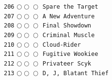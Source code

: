 \documentclass[a4paper,landscape]{article}
\begin{document}
\begin{multicols*}{5}
\texttt{206} \(\bigcirc\!\bigcirc\!\bigcirc\)  \texttt{Spare the Target} \vspace{-0.3mm}\\ 
\texttt{207} \(\bigcirc\!\bigcirc\!\bigcirc\)  \texttt{A New Adventure} \vspace{-0.3mm}\\ 
\texttt{208} \(\bigcirc\!\bigcirc\!\bigcirc\)  \texttt{Final Showdown} \vspace{-0.3mm}\\ 
\texttt{209} \(\bigcirc\!\bigcirc\!\bigcirc\)  \texttt{Criminal Muscle} \vspace{-0.3mm}\\ 
\texttt{210} \(\bigcirc\!\bigcirc\!\bigcirc\)  \texttt{Cloud-Rider} \vspace{-0.3mm}\\ 
\texttt{211} \(\bigcirc\!\bigcirc\!\bigcirc\)  \texttt{Fugitive Wookiee} \vspace{-0.3mm}\\ 
\texttt{212} \(\bigcirc\!\bigcirc\!\bigcirc\)  \texttt{Privateer Scyk} \vspace{-0.3mm}\\ 
\texttt{213} \(\bigcirc\!\bigcirc\!\bigcirc\)  \texttt{D, J, Blatant Thief} \vspace{-0.3mm}\\ 

\end{multicols*}
\end{document}
